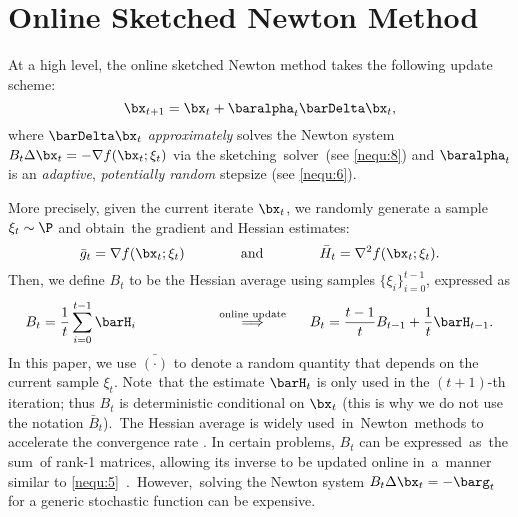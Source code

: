 
\section{Online Sketched Newton Method}\label{sec:2}

At a high level, the online sketched Newton method takes the following update scheme:
\begin{equation}\label{nequ:7}
\bx_{t+1} = \bx_t + \baralpha_t \barDelta\bx_t,
\end{equation}
where $\barDelta\bx_t$ \textit{approximately} solves the Newton system $B_t\Delta\bx_t = - \nabla f(\bx_t; \xi_t)$ via the sketching~solver~(see \eqref{nequ:8}) and $\baralpha_t$ is an \textit{adaptive}, \textit{potentially random} stepsize (see \eqref{nequ:6}). 

More precisely, given the current iterate $\bx_t$, we randomly generate a sample $\xi_t\sim \P$ and obtain~the gradient and Hessian estimates:
\begin{equation*}
\bar{g}_t = \nabla f(\bx_t;\xi_t)\hskip1.3cm \text{ and }\hskip1.3cm \bar{H}_t = \nabla^2 f(\bx_t;\xi_t).
\end{equation*}
Then, we define $B_t$ to be the Hessian average using samples $\{\xi_i\}_{i=0}^{t-1}$, expressed as
\begin{equation}\label{nequ:5}
B_t = \frac{1}{t}\sum_{i=0}^{t-1} \barH_i \hskip2cm \stackrel{\text{online update}}{\Longrightarrow} \hskip0.5cm B_t = \frac{t-1}{t}B_{t-1} + \frac{1}{t}\barH_{t-1}.
\end{equation}
In this paper, we use $\bar{(\cdot)}$ to denote a random quantity that depends on the current sample $\xi_t$. Note~that the estimate $\barH_t$ is only used in the $(t+1)$-th iteration; thus $B_t$ is deterministic conditional on $\bx_t$ (this is why we do not use the notation $\bar{B}_t$).~The Hessian average is widely used~in~\mbox{Newton}~methods to accelerate the convergence rate \citep{Na2022Hessian}. In certain problems, $B_t$ can be expressed~as~the sum~of rank-1 matrices, allowing its inverse to be updated online in~a~manner similar to \eqref{nequ:5}~\citep{Bercu2020Efficient, Cenac2020efficient, Boyer2022asymptotic, Leluc2023Asymptotic}.~\mbox{However},~solving the Newton system $B_t\Delta\bx_t = -\barg_t$ for a generic stochastic function can be expensive.


